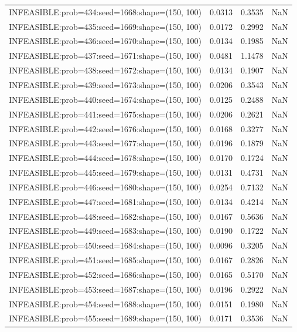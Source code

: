 \begin{longtable}{lccc}
INFEASIBLE:prob=434:seed=1668:shape=(150, 100) &   0.0313 &  0.3535 &    NaN \\
INFEASIBLE:prob=435:seed=1669:shape=(150, 100) &   0.0172 &  0.2992 &    NaN \\
INFEASIBLE:prob=436:seed=1670:shape=(150, 100) &   0.0134 &  0.1985 &    NaN \\
INFEASIBLE:prob=437:seed=1671:shape=(150, 100) &   0.0481 &  1.1478 &    NaN \\
INFEASIBLE:prob=438:seed=1672:shape=(150, 100) &   0.0134 &  0.1907 &    NaN \\
INFEASIBLE:prob=439:seed=1673:shape=(150, 100) &   0.0206 &  0.3543 &    NaN \\
INFEASIBLE:prob=440:seed=1674:shape=(150, 100) &   0.0125 &  0.2488 &    NaN \\
INFEASIBLE:prob=441:seed=1675:shape=(150, 100) &   0.0206 &  0.2621 &    NaN \\
INFEASIBLE:prob=442:seed=1676:shape=(150, 100) &   0.0168 &  0.3277 &    NaN \\
INFEASIBLE:prob=443:seed=1677:shape=(150, 100) &   0.0196 &  0.1879 &    NaN \\
INFEASIBLE:prob=444:seed=1678:shape=(150, 100) &   0.0170 &  0.1724 &    NaN \\
INFEASIBLE:prob=445:seed=1679:shape=(150, 100) &   0.0131 &  0.4731 &    NaN \\
INFEASIBLE:prob=446:seed=1680:shape=(150, 100) &   0.0254 &  0.7132 &    NaN \\
INFEASIBLE:prob=447:seed=1681:shape=(150, 100) &   0.0134 &  0.4214 &    NaN \\
INFEASIBLE:prob=448:seed=1682:shape=(150, 100) &   0.0167 &  0.5636 &    NaN \\
INFEASIBLE:prob=449:seed=1683:shape=(150, 100) &   0.0190 &  0.1722 &    NaN \\
INFEASIBLE:prob=450:seed=1684:shape=(150, 100) &   0.0096 &  0.3205 &    NaN \\
INFEASIBLE:prob=451:seed=1685:shape=(150, 100) &   0.0167 &  0.2826 &    NaN \\
INFEASIBLE:prob=452:seed=1686:shape=(150, 100) &   0.0165 &  0.5170 &    NaN \\
INFEASIBLE:prob=453:seed=1687:shape=(150, 100) &   0.0196 &  0.2922 &    NaN \\
INFEASIBLE:prob=454:seed=1688:shape=(150, 100) &   0.0151 &  0.1980 &    NaN \\
INFEASIBLE:prob=455:seed=1689:shape=(150, 100) &   0.0171 &  0.3536 &    NaN \\

\end{longtable}
